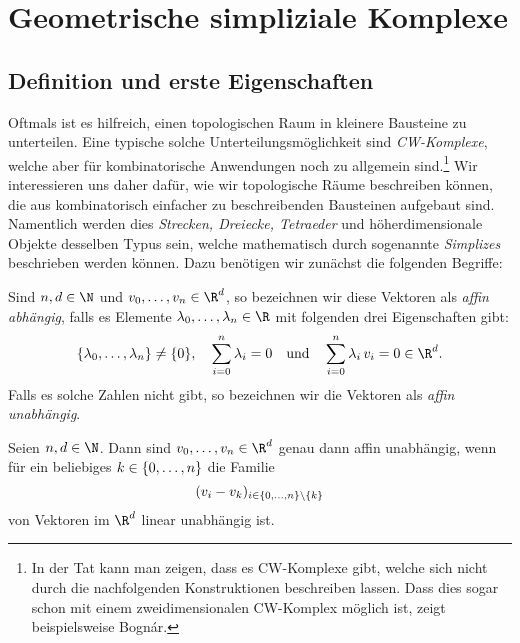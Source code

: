 \chapter{Geometrische simpliziale Komplexe}
\section{Definition und erste Eigenschaften} %
Oftmals ist es hilfreich, einen topologischen Raum in kleinere Bausteine zu
unterteilen. Eine typische solche Unterteilungsmöglichkeit sind \emph{CW-Komplexe}, welche
aber für kombinatorische Anwendungen noch zu allgemein sind.\footnote{%
    In der Tat kann man zeigen, dass es CW-Komplexe gibt, welche sich nicht
    durch die nachfolgenden Konstruktionen beschreiben lassen. Dass dies sogar
    schon mit einem zweidimensionalen CW-Komplex möglich ist, zeigt
    beispielsweise Bognár.\cite{artcle:bognar77}%
}
Wir interessieren uns daher dafür, wie wir topologische Räume beschreiben
können, die aus kombinatorisch einfacher zu beschreibenden Bausteinen aufgebaut
sind. Namentlich werden dies \emph{Strecken, Dreiecke, Tetraeder} und
höherdimensionale Objekte desselben Typus sein, welche mathematisch durch
sogenannte \emph{Simplizes} beschrieben werden können. Dazu benötigen wir
zunächst die folgenden Begriffe:

\begin{thDef}
    Sind $n,d\in\N$ und $v_0,\ldots,v_n\in\R^d$, so bezeichnen wir diese
    Vektoren als \emph{affin abhängig}, falls es Elemente
    $\lambda_0,\ldots,\lambda_n \in\R$ mit folgenden drei Eigenschaften gibt:
    \[ \{\lambda_0,\ldots,\lambda_n\} \neq \{0\}, \quad \isum^n \lambda_i = 0
    \qundq \isum^n \lambda_i\,v_i = 0 \in\R^d.\] 
    Falls es solche Zahlen nicht gibt, so bezeichnen wir die Vektoren als
    \emph{affin unabhängig}.
\end{thDef}

\begin{thLemma}
    \label{gsc:iffaffinlyindependet}
    Seien $n,d\in\N$. Dann sind $v_0,\ldots,v_n\in\R^d$ genau dann affin
    unabhängig, wenn für ein beliebiges $k\in\{0,\ldots,n\}$ die Familie
    \[  (v_i - v_k)_{i \in\{0,\ldots,n\}\setminus\{k\}} \] 
    von Vektoren im $\R^d$ linear unabhängig ist.
\end{thLemma}

